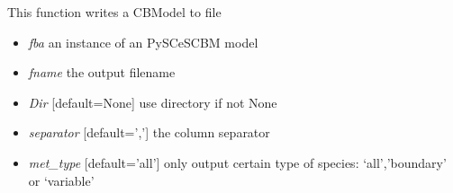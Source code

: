 \documentclass[a4paper,11pt,english]{sphinxmanual}
\begin{document}

\begin{fulllineitems}
\label{modules_doc:cbmpy.CBWrite.writeSpeciesInfoToFile}
This function writes a CBModel to file
\begin{itemize}
\item {} 
\emph{fba} an instance of an PySCeSCBM model

\item {} 
\emph{fname} the output filename

\item {} 
\emph{Dir} {[}default=None{]} use directory if not None

\item {} 
\emph{separator} {[}default=','{]} the column separator

\item {} 
\emph{met\_type} {[}default='all'{]} only output certain type of species: `all','boundary' or `variable'

\end{itemize}

\end{fulllineitems}

\end{document}
